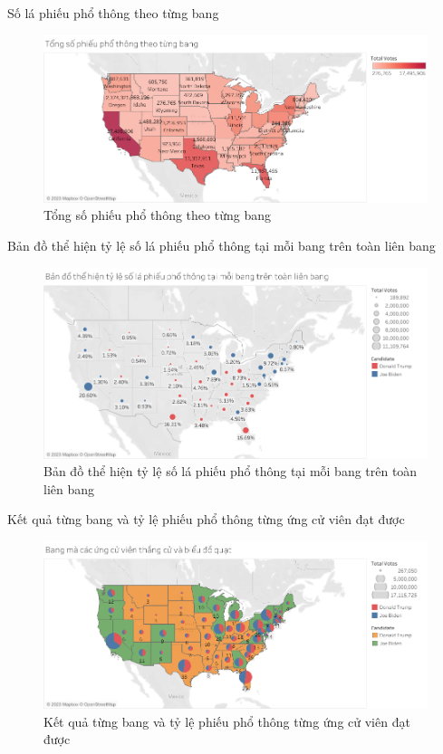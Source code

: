 \documentclass[10pt]{beamer}
\theoremstyle{remark}
\theoremstyle{definition}
\begin{document}
\begin{frame}{Số lá phiếu phổ thông theo từng bang}
	\begin{figure}[h!]
        \centering
        \includegraphics[width=\textwidth]{Popular_Votes_States_by_Color.png}
        \caption{Tổng số phiếu phổ thông theo từng bang}
    \end{figure}
\end{frame}

\begin{frame}{Bản đồ thể hiện tỷ lệ số lá phiếu phổ thông tại mỗi bang trên toàn liên bang}
	\begin{figure}[h!]
        \centering
        \includegraphics[width=\textwidth]{State_Percentage_Vote_Circle.png}
        \caption{Bản đồ thể hiện tỷ lệ số lá phiếu phổ thông tại mỗi bang trên toàn liên bang}
    \end{figure}
\end{frame}

\begin{frame}{Kết quả từng bang và tỷ lệ phiếu phổ thông từng ứng cử viên đạt được}
	\begin{figure}[h!]
        \centering
        \includegraphics[width=\textwidth]{figures/State_Win_Candidate_and_Pie_chart.png}
        \caption{Kết quả từng bang và tỷ lệ phiếu phổ thông từng ứng cử viên đạt được}
    \end{figure}
\end{frame}
\end{document}
